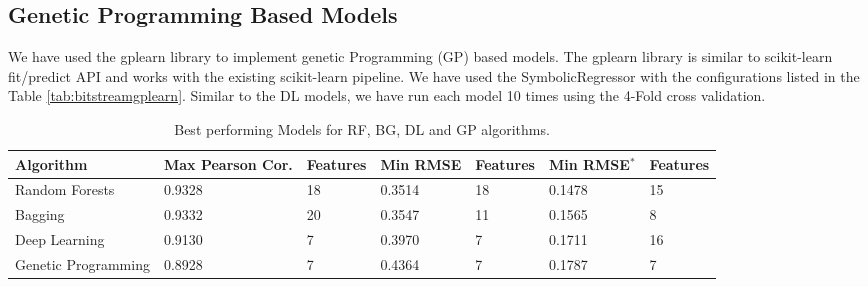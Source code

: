 \documentclass[journal]{IEEEtran}
\begin{document}
\subsection{Genetic Programming Based Models}

We have used the gplearn library to implement genetic Programming (GP) based models. The gplearn library is similar to scikit-learn fit/predict API and works with the existing scikit-learn pipeline. We have used the SymbolicRegressor with the configurations listed in the Table \ref{tab:bitstreamgplearn}. Similar to the DL models, we have run each model 10 times using the 4-Fold cross validation. 

\begin{table}
\centering
\caption{Best performing Models for RF, BG, DL and GP algorithms.}
\label{tab:maxminvalues}
\begin{tabular}{|l||l|l||l|l||l|l|} \hline
Algorithm & Max Pearson Cor. & Features & Min RMSE & Features & Min RMSE$^*$ & Features \\ \hline
Random Forests & 0.9328 & 18 & 0.3514 & 18 & 0.1478 & 15 \\ \hline
Bagging & 0.9332 & 20 & 0.3547 & 11 & 0.1565 & 8 \\ \hline
Deep Learning & 0.9130 & 7 & 0.3970 & 7 & 0.1711 & 16 \\ \hline
Genetic Programming & 0.8928 & 7 & 0.4364 & 7 & 0.1787 & 7 \\ \hline
\end{tabular}
\end{table}
\end{document}
